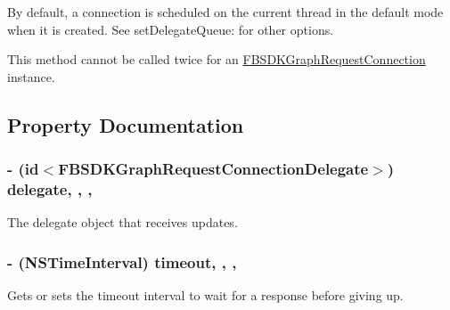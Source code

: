 By default, a connection is scheduled on the current thread in the default mode when it is created. See {\ttfamily set\+Delegate\+Queue\+:} for other options.

This method cannot be called twice for an {\ttfamily \hyperlink{interface_f_b_s_d_k_graph_request_connection}{F\+B\+S\+D\+K\+Graph\+Request\+Connection}} instance. 

\subsection{Property Documentation}
\hypertarget{interface_f_b_s_d_k_graph_request_connection_ac52bf8613194e0184e5ac33806dd6f7c}{}
\subsubsection[{delegate}]{\setlength{\rightskip}{0pt plus 5cm}-\/ (id$<${\bf F\+B\+S\+D\+K\+Graph\+Request\+Connection\+Delegate}$>$) delegate\hspace{0.3cm}{\ttfamily [read]}, {\ttfamily [write]}, {\ttfamily [nonatomic]}, {\ttfamily [assign]}}\label{interface_f_b_s_d_k_graph_request_connection_ac52bf8613194e0184e5ac33806dd6f7c}
The delegate object that receives updates. \hypertarget{interface_f_b_s_d_k_graph_request_connection_ad70caeba73b8f5c748d2f34b0bec74e0}{}
\subsubsection[{timeout}]{\setlength{\rightskip}{0pt plus 5cm}-\/ (N\+S\+Time\+Interval) timeout\hspace{0.3cm}{\ttfamily [read]}, {\ttfamily [write]}, {\ttfamily [nonatomic]}, {\ttfamily [assign]}}\label{interface_f_b_s_d_k_graph_request_connection_ad70caeba73b8f5c748d2f34b0bec74e0}
Gets or sets the timeout interval to wait for a response before giving up. \hypertarget{interface_f_b_s_d_k_graph_request_connection_a5179644ed8074f7e45e664c6ec5b17ab}{}
